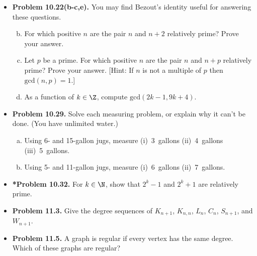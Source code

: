 \documentclass[11pt]{article}
\begin{document}
\begin{itemize}
\vspace{0.1in}

\item \textbf{Problem 10.22(b-c,e).}
You may find Bezout's identity useful for answering these questions.
\begin{enumerate}[(a)]
\setcounter{enumi}{1}
\item For which positive $n$ are the pair $n$ and $n+2$ relatively prime?
  Prove your answer.
\item Let $p$ be a prime.
  For which positive $n$ are the pair $n$ and $n+p$ relatively prime?
  Prove your answer.
  [Hint: If $n$ is not a multiple of $p$ then $\text{gcd}(n,p)=1$.]
\setcounter{enumi}{4}
\item As a function of $k\in\Z$, compute $\text{gcd}(2k-1,9k+4)$.
\end{enumerate}

\vspace{0.1in}

\item \textbf{Problem 10.29.}
Solve each measuring problem, or explain why it can't be done.
(You have unlimited water.)
\begin{enumerate}[(a)]
\item Using 6- and 15-gallon jugs, measure (i)~3~gallons (ii)~4~gallons (iii)~5~gallons.
\item Using 5- and 11-gallon jugs, measure (i)~6~gallons (ii)~7~gallons.
\end{enumerate}

\vspace{0.1in}

\item \textbf{*Problem 10.32.}
For $k\in\N$, show that $2^k-1$ and $2^k+1$ are relatively prime.

\vspace{0.1in}

\item \textbf{Problem 11.3.}
Give the degree sequences of $K_{n+1}$, $K_{n,n}$, $L_n$, $C_n$, $S_{n+1}$, and $W_{n+1}$.

\vspace{0.1in}

\item \textbf{Problem 11.5.}
A graph is regular if every vertex has the same degree.
Which of these graphs are regular?
\begin{enumerate}[(a)]
\end{enumerate}


\end{itemize}
\end{document}
